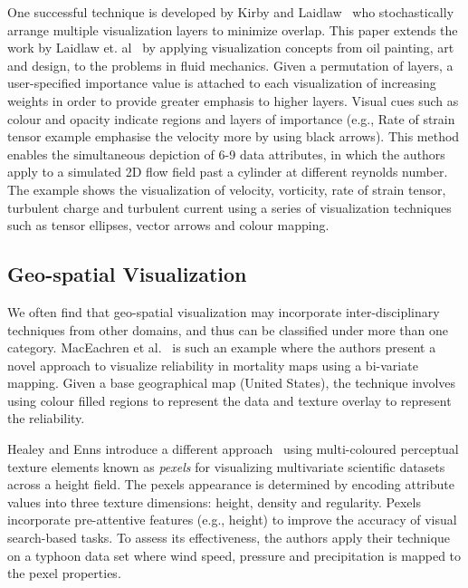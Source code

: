 One successful technique is developed by Kirby and Laidlaw~\cite{kirby99multiValueFlow} who stochastically arrange multiple visualization layers to minimize overlap. 
This paper extends the work by Laidlaw et. al~\cite{laidlaw98} by applying visualization concepts from oil painting, art and design, to the problems in fluid mechanics.
Given a permutation of layers, a user-specified importance value is attached to each visualization of increasing weights in order to provide greater emphasis to higher layers.
Visual cues such as colour and opacity indicate regions and layers of importance (e.g., Rate of strain tensor example emphasise the velocity more by using black arrows). 
This method enables the simultaneous depiction of 6-9 data attributes, in which the authors apply to a simulated 2D flow field past a cylinder at different reynolds number. 
The example shows the visualization of velocity, vorticity, rate of strain tensor, turbulent charge and turbulent current using a series of visualization techniques such as tensor ellipses, vector arrows and colour mapping.  


\subsection{Geo-spatial Visualization}

We often find that geo-spatial visualization may incorporate inter-disciplinary techniques from other domains, and thus can be classified under more than one category. MacEachren et al.~\cite{maceachren98visualizingGeoreferenced} is such an example where the authors present a novel approach to visualize reliability in mortality maps using a bi-variate mapping. Given a base geographical map (United States), the technique involves using colour filled regions to represent the data and texture overlay to represent the reliability.

Healey and Enns introduce a different approach~\cite{healey99largeDatasetsAtGlance} using multi-coloured perceptual texture elements known as \textit{pexels} for visualizing multivariate scientific datasets across a height field. The pexels appearance is determined by encoding attribute values into three texture dimensions: height, density and regularity.
Pexels incorporate pre-attentive features (e.g., height) to improve the accuracy of visual search-based tasks.
To assess its effectiveness, the authors apply their technique on a typhoon data set where wind speed, pressure and precipitation is mapped to the pexel properties.

